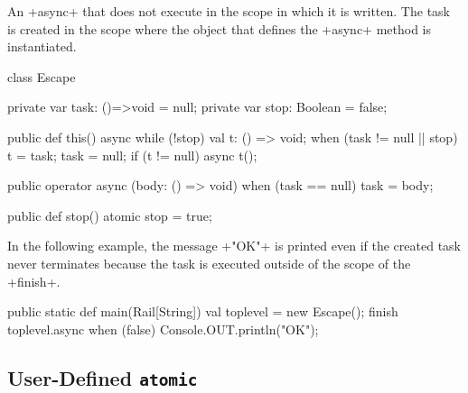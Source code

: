 \begin{ex}
  An \xcd+async+ that does not execute in the scope in which it is
  written. The task is created in the scope where the object that
  defines the \xcd+async+ method is instantiated.
\begin{xten}
class Escape {
  private var task: ()=>void = null;
  private var stop: Boolean = false;

  public def this() {
    async {
      while (!stop) {
        val t: () => void;
        when (task != null || stop) {
          t = task;
          task = null;
        }
        if (t != null) {
          async { t(); }
        }
      }
    }
  }

  public operator async (body: () => void) {
    when (task == null) {
      task = body;
    }
  }

  public def stop() {
    atomic { stop = true; }
  }
}
\end{xten}
%

  In the following example, the message \xcd+"OK"+ is printed even if
  the created task never terminates because the task is executed
  outside of the scope of the \xcd+finish+.
\begin{xten}
public static def main(Rail[String]) {
  val toplevel = new Escape();
  finish {
    toplevel.async { when (false){} }
  }
  Console.OUT.println("OK");
}
\end{xten}
\end{ex}

\subsection{User-Defined \texttt{atomic}}

